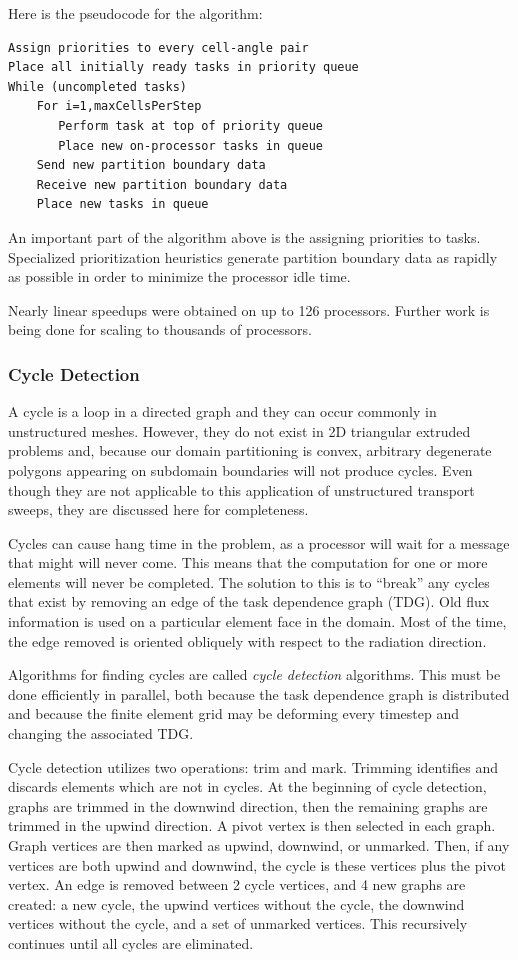 \documentclass[11pt, letterpaper,titlepage,oneside]{article}
\begin{document}
Here is the pseudocode for the algorithm:

\begin{verbatim}
Assign priorities to every cell-angle pair
Place all initially ready tasks in priority queue
While (uncompleted tasks)
    For i=1,maxCellsPerStep
       Perform task at top of priority queue
       Place new on-processor tasks in queue
    Send new partition boundary data
    Receive new partition boundary data
    Place new tasks in queue 
\end{verbatim}

An important part of the algorithm above is the assigning priorities to tasks. Specialized prioritization heuristics generate partition boundary data as rapidly as possible in order to minimize the processor idle time. 

Nearly linear speedups were obtained on up to 126 processors. Further work is being done for scaling to thousands of processors. 

\subsubsection{Cycle Detection}

A cycle is a loop in a directed graph and they can occur commonly in unstructured meshes. However, they do not exist in 2D triangular extruded problems and, because our domain partitioning is convex, arbitrary degenerate polygons appearing on subdomain boundaries will not produce cycles. Even though they are not applicable to this application of unstructured transport sweeps, they are discussed here for completeness.

Cycles can cause hang time in the problem, as a processor will wait for a message that might will never come. This means that the computation for one or more elements will never be completed. The solution to this is to ``break'' any cycles that exist by removing an edge of the task dependence graph (TDG). Old flux information is used on a particular element face in the domain. Most of the time, the edge removed is oriented obliquely with respect to the radiation direction. 

Algorithms for finding cycles are called \textit{cycle detection} algorithms. This must be done efficiently in parallel, both because the task dependence graph is distributed and because the finite element grid may be deforming every timestep and changing the associated TDG.

Cycle detection utilizes two operations: trim and mark. Trimming identifies and discards elements which are not in cycles. At the beginning of cycle detection, graphs are trimmed in the downwind direction, then the remaining graphs are trimmed in the upwind direction. A pivot vertex is then selected in each graph. Graph vertices are then marked as upwind, downwind, or unmarked. Then, if any vertices are both upwind and downwind, the cycle is these vertices plus the pivot vertex. An edge is removed between 2 cycle vertices, and 4 new graphs are created: a new cycle, the upwind vertices without the cycle, the downwind vertices without the cycle, and a set of unmarked vertices. This recursively continues until all cycles are eliminated.
\end{document}
